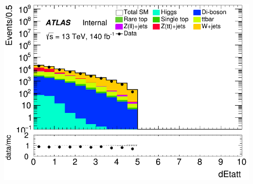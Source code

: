 \documentclass[usenames,dvipsnames]{beamer}
\begin{document}
\begin{frame}
\begin{minipage}{0.32\textwidth}
        \centering
        \includegraphics[width=\textwidth]{graphics/LH_met/LH_met_dEtatt.png}
    \end{minipage}
    
    \vspace{0.5cm} %
\end{frame}
\end{document}
